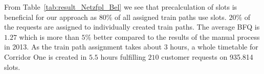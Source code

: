 From Table~\ref{tab:result_Netzfpl_Bel} we see that precalculation of slots is beneficial for our approach as $80\%$ of all assigned train paths use slots. $20\%$ of the requests are assigned to individually created train paths. The average BFQ is $1.27$ which is more than $5\%$ better compared to the results of the manual process in 2013. As the train path assignment takes about $3$ hours, a whole timetable for Corridor One is created in $5.5$ hours fulfilling $210$ customer requests on 935.814 slots.